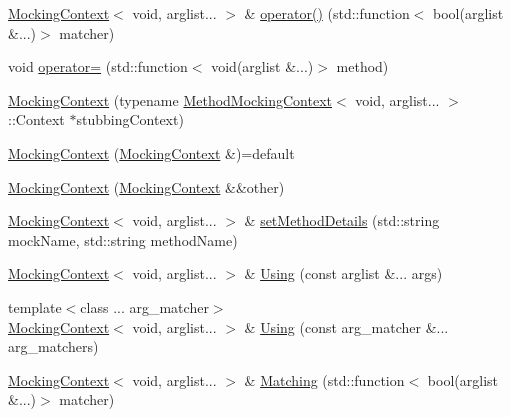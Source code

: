 \begin{DoxyCompactItemize}
\item 
\mbox{\hyperlink{classfakeit_1_1MockingContext}{Mocking\+Context}}$<$ void, arglist... $>$ \& \mbox{\hyperlink{classfakeit_1_1MockingContext_3_01void_00_01arglist_8_8_8_01_4_a1a5a55569a763877d395635979e6b3d6}{operator()}} (std\+::function$<$ bool(arglist \&...)$>$ matcher)
\item 
void \mbox{\hyperlink{classfakeit_1_1MockingContext_3_01void_00_01arglist_8_8_8_01_4_a86584df9e9a7a73b078ad68fa5893d50}{operator=}} (std\+::function$<$ void(arglist \&...)$>$ method)
\item 
\mbox{\hyperlink{classfakeit_1_1MockingContext_3_01void_00_01arglist_8_8_8_01_4_a655f7e31674dfb282f30a94f31ffd2a7}{Mocking\+Context}} (typename \mbox{\hyperlink{classfakeit_1_1MethodMockingContext}{Method\+Mocking\+Context}}$<$ void, arglist... $>$\+::Context $\ast$stubbing\+Context)
\item 
\mbox{\hyperlink{classfakeit_1_1MockingContext_3_01void_00_01arglist_8_8_8_01_4_a750dcc8fb80a9931c41143ce73d7177c}{Mocking\+Context}} (\mbox{\hyperlink{classfakeit_1_1MockingContext}{Mocking\+Context}} \&)=default
\item 
\mbox{\hyperlink{classfakeit_1_1MockingContext_3_01void_00_01arglist_8_8_8_01_4_a1f7b3663809191b919290f0db05d59f1}{Mocking\+Context}} (\mbox{\hyperlink{classfakeit_1_1MockingContext}{Mocking\+Context}} \&\&other)
\item 
\mbox{\hyperlink{classfakeit_1_1MockingContext}{Mocking\+Context}}$<$ void, arglist... $>$ \& \mbox{\hyperlink{classfakeit_1_1MockingContext_3_01void_00_01arglist_8_8_8_01_4_a5479ea5b1a1f32898cc9592bfb1c7777}{set\+Method\+Details}} (std\+::string mock\+Name, std\+::string method\+Name)
\item 
\mbox{\hyperlink{classfakeit_1_1MockingContext}{Mocking\+Context}}$<$ void, arglist... $>$ \& \mbox{\hyperlink{classfakeit_1_1MockingContext_3_01void_00_01arglist_8_8_8_01_4_a0dad4e59214a5fdcacad0e4a170df071}{Using}} (const arglist \&... args)
\item 
{\footnotesize template$<$class ... arg\+\_\+matcher$>$ }\\\mbox{\hyperlink{classfakeit_1_1MockingContext}{Mocking\+Context}}$<$ void, arglist... $>$ \& \mbox{\hyperlink{classfakeit_1_1MockingContext_3_01void_00_01arglist_8_8_8_01_4_aaab0ad3883ab87bd3885671e3266546e}{Using}} (const arg\+\_\+matcher \&... arg\+\_\+matchers)
\item 
\mbox{\hyperlink{classfakeit_1_1MockingContext}{Mocking\+Context}}$<$ void, arglist... $>$ \& \mbox{\hyperlink{classfakeit_1_1MockingContext_3_01void_00_01arglist_8_8_8_01_4_a28152fc4e0105f5e6424515367a5d4c3}{Matching}} (std\+::function$<$ bool(arglist \&...)$>$ matcher)

\end{DoxyCompactItemize}
